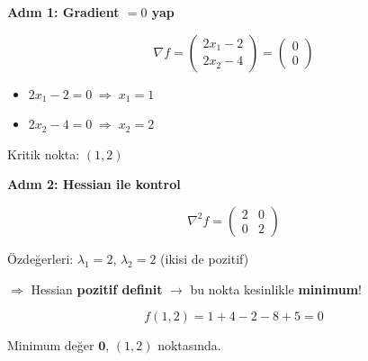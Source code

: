 \documentclass[12pt,a4paper]{article}
\theoremstyle{definition}
\theoremstyle{remark}
\begin{document}
\textbf{Ad{\i}m 1: Gradient $= 0$ yap}

\[
\nabla f = \begin{pmatrix} 2x_1 - 2 \\ 2x_2 - 4 \end{pmatrix} = \begin{pmatrix} 0 \\ 0 \end{pmatrix}
\]

\begin{itemize}
    \item $2x_1 - 2 = 0 \;\Rightarrow\; x_1 = 1$
    \item $2x_2 - 4 = 0 \;\Rightarrow\; x_2 = 2$
\end{itemize}

Kritik nokta: $(1, 2)$

\textbf{Ad{\i}m 2: Hessian ile kontrol}

\[
\nabla^2 f = \begin{pmatrix} 2 & 0 \\ 0 & 2 \end{pmatrix}
\]

\"Ozde\u{g}erleri: $\lambda_1 = 2$, $\lambda_2 = 2$ (ikisi de pozitif)

$\Rightarrow$ Hessian \textbf{pozitif definit} $\to$ bu nokta kesinlikle \textbf{minimum}!

\[
f(1, 2) = 1 + 4 - 2 - 8 + 5 = 0
\]

Minimum de\u{g}er $\mathbf{0}$, $(1, 2)$ noktas{\i}nda.
\end{document}
